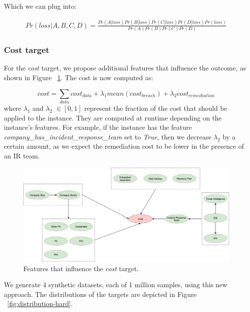 Which we can plug into:

\begin{equation} \label{eq6}
\begin{split}
Pr(loss|A,B,C,D) = \frac{Pr(A|loss)Pr(B|loss)Pr(C|loss)Pr(D|loss)Pr(loss)}{Pr(A)Pr(B)Pr(C)Pr(D)}
\end{split}
\end{equation}

\subsubsection{Cost target}\label{subsubsection:cost_calc}

For the \textit{cost} target, we propose additional features that influence the outcome, as shown in Figure ~\ref{fig:cost}. The cost is now computed as:

\begin{equation}\label{eq7}
	cost = \sum_{data}{cost_{data}} + \lambda_1mean(cost_{breach}) + \lambda_2cost_{remediation}
\end{equation}
where $\lambda_1$ and $\lambda_2$ $\in [0, 1]$ represent the fraction of the cost that should be applied to the instance. They are computed at runtime depending on the instance's features. For example, if the instance has the feature \textit{company\_has\_incident\_response\_team} set to \textit{True}, then we decrease $\lambda_2$ by a certain amount, as we expect the remediation cost to be lower in the presence of an IR team.

\begin{figure}[h!]
	\center
	\includegraphics[scale=0.6]{images/synthetic/cost.png}
	\caption{\label{fig:cost} Features that influence the \textit{cost} target.}
\end{figure}

We generate 4 synthetic datasets, each of 1 million samples, using this new approach. The distributions of the targets are depicted in Figure ~\ref{fig:distribution-hard}.

